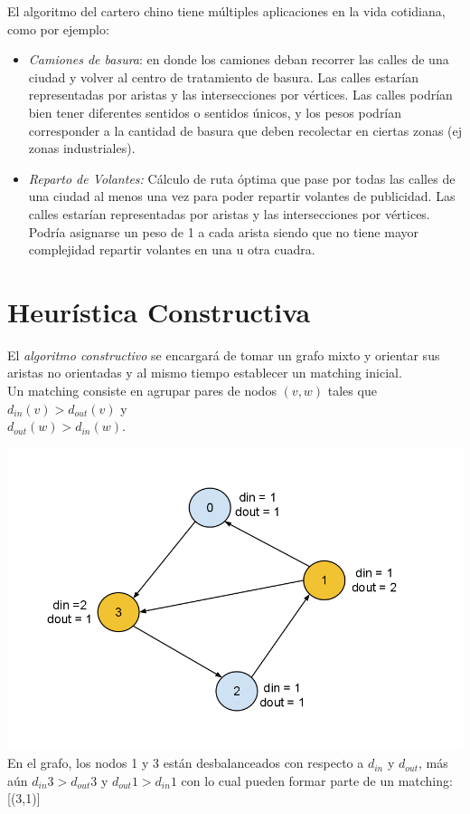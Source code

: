 \documentclass[11pt, a4paper, spanish]{article}
\begin{document}
    El algoritmo del cartero chino tiene m\'ultiples aplicaciones en la vida cotidiana, como por ejemplo:

	\begin{itemize}
	\item \emph{Camiones de basura}: en donde los camiones deban recorrer las calles de una ciudad y volver al centro de tratamiento de basura. Las calles estar\'ian representadas por aristas y las intersecciones por v\'ertices. Las calles podr\'ian bien tener diferentes sentidos o sentidos \'unicos, y los pesos podr\'ian corresponder a la cantidad de basura que deben recolectar en ciertas zonas (ej zonas industriales).
	\end{itemize}

	\begin{itemize}
	\item \emph{Reparto de Volantes:} C\'alculo de ruta \'optima que pase por todas las calles de una ciudad al menos una vez para poder repartir volantes de publicidad. Las calles estar\'ian representadas por aristas y las intersecciones por v\'ertices. Podr\'ia asignarse un peso de 1 a cada arista siendo que no tiene mayor complejidad repartir volantes en una u otra cuadra.
	\end{itemize}

\newpage
\section{Heur\'istica Constructiva}

	El \emph{algoritmo constructivo} se encargar\'a de tomar un grafo mixto y orientar sus aristas no orientadas y al mismo tiempo establecer un matching inicial.\\ Un matching consiste en agrupar pares de nodos ${(v,w)}$ tales que $d_{in}(v) > d_{out}(v)$ y\\ $d_{out}(w) > d_{in}(w)$.

\begin{center}
\centering \includegraphics[scale=0.30]{img/Matching.png}\\
\small{En el grafo, los nodos 1 y 3 est\'an desbalanceados con respecto a $d_{in}$ y $d_{out}$, m\'as a\'un $d_{in} 3 > d_{out} 3$ y $d_{out} 1 > d_{in} 1$ con lo cual pueden formar parte de un matching: [(3,1)]}
\end{center}
\end{document}
